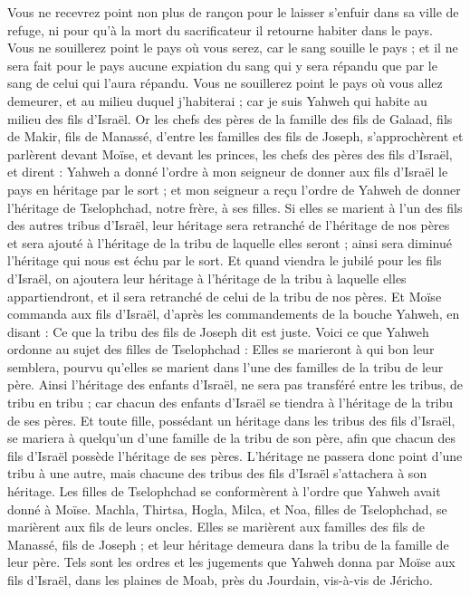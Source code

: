 \begin{multicols}{2}
Vous ne recevrez point non plus de rançon pour le laisser s’enfuir dans sa ville de refuge, ni pour qu'à la mort du sacrificateur il retourne habiter dans le pays.
Vous ne souillerez point le pays où vous serez, car le sang souille le pays ; et il ne sera fait pour le pays aucune expiation du sang qui y sera répandu que par le sang de celui qui l'aura répandu.
Vous ne souillerez point le pays où vous allez demeurer, et au milieu duquel j'habiterai ; car je suis Yahweh qui habite au milieu des fils d'Israël.
\VerseOne{}Or les chefs des pères de la famille des fils de Galaad, fils de Makir, fils de Manassé, d'entre les familles des fils de Joseph, s'approchèrent et parlèrent devant Moïse, et devant les princes, les chefs des pères des fils d'Israël,
et dirent : Yahweh a donné l’ordre à mon seigneur de donner aux fils d'Israël le pays en héritage par le sort ; et mon seigneur a reçu l'ordre de Yahweh de donner l'héritage de Tselophchad, notre frère, à ses filles.
Si elles se marient à l'un des fils des autres tribus d'Israël, leur héritage sera retranché de l'héritage de nos pères et sera ajouté à l’héritage de la tribu de laquelle elles seront ; ainsi sera diminué l'héritage qui nous est échu par le sort.
Et quand viendra le jubilé pour les fils d'Israël, on ajoutera leur héritage à l'héritage de la tribu à laquelle elles appartiendront, et il sera retranché de celui de la tribu de nos pères.
Et Moïse commanda aux fils d'Israël, d’après les commandements de la bouche Yahweh, en disant : Ce que la tribu des fils de Joseph dit est juste.
Voici ce que Yahweh ordonne au sujet des filles de Tselophchad : Elles se marieront à qui bon leur semblera, pourvu qu’elles se marient dans l'une des familles de la tribu de leur père.
Ainsi l’héritage des enfants d’Israël, ne sera pas transféré entre les tribus, de tribu en tribu ; car chacun des enfants d’Israël se tiendra à l’héritage de la tribu de ses pères.
Et toute fille, possédant un héritage dans les tribus des fils d'Israël, se mariera à quelqu'un d’une famille de la tribu de son père, afin que chacun des fils d'Israël possède l'héritage de ses pères.
L'héritage ne passera donc point d'une tribu à une autre, mais chacune des tribus des fils d'Israël s’attachera à son héritage.
Les filles de Tselophchad se conformèrent à l’ordre que Yahweh avait donné à Moïse.
Machla, Thirtsa, Hogla, Milca, et Noa, filles de Tselophchad, se marièrent aux fils de leurs oncles.
Elles se marièrent aux familles des fils de Manassé, fils de Joseph ; et leur héritage demeura dans la tribu de la famille de leur père.
Tels sont les ordres et les jugements que Yahweh donna par Moïse aux fils d'Israël, dans les plaines de Moab, près du Jourdain, vis-à-vis de Jéricho.
\PPE{}
\end{multicols}
